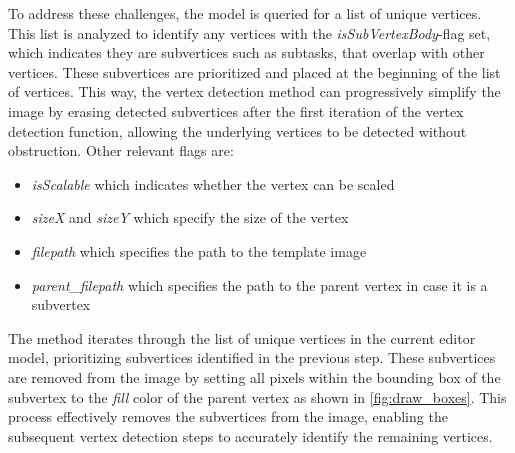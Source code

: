 To address these challenges, the model is queried for a list of unique vertices. This list is analyzed to identify any vertices with the \textit{isSubVertexBody}-flag set, which indicates they are subvertices such as subtasks, that overlap with other vertices. These subvertices are prioritized and placed at the beginning of the list of vertices. This way, the vertex detection method can progressively simplify the image by erasing detected subvertices after the first iteration of the vertex detection function, allowing the underlying vertices to be detected without obstruction. Other relevant flags are:
\begin{itemize}
    \item \textit{isScalable} which indicates whether the vertex can be scaled
    \item \textit{sizeX} and \textit{sizeY} which specify the size of the vertex
    \item \textit{filepath} which specifies the path to the template image
    \item \textit{parent\_filepath} which specifies the path to the parent vertex in case it is a subvertex
\end{itemize}
The method iterates through the list of unique vertices in the current editor model, prioritizing subvertices identified in the previous step. These subvertices are removed from the image by setting all pixels within the bounding box of the subvertex to the \textit{fill} color of the parent vertex as shown in \autoref{fig:draw_boxes}. This process effectively removes the subvertices from the image, enabling the subsequent vertex detection steps to accurately identify the remaining vertices.\\
